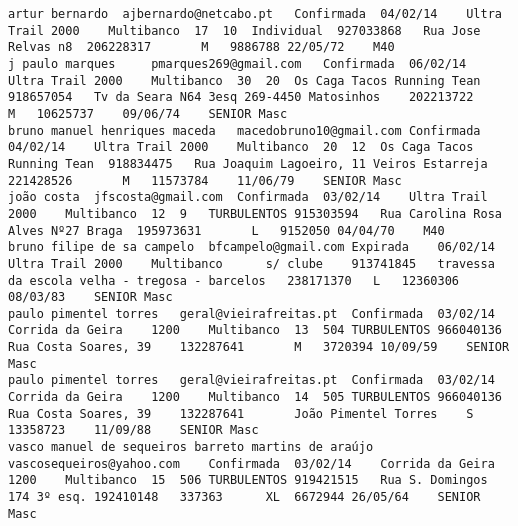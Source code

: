 \documentclass[11pt,a4paper]{report}
\begin{document}
\begin{verbatim}
artur bernardo 	ajbernardo@netcabo.pt	Confirmada	04/02/14	Ultra Trail	2000	Multibanco	17	10	Individual	927033868	Rua Jose Relvas n8	206228317		M	9886788	22/05/72	M40	
j paulo marques 	pmarques269@gmail.com	Confirmada	06/02/14	Ultra Trail	2000	Multibanco	30	20	Os Caga Tacos Running Tean	918657054	Tv da Seara N64 3esq 269-4450 Matosinhos	202213722		M	10625737	09/06/74	SENIOR Masc	
bruno manuel henriques maceda 	macedobruno10@gmail.com	Confirmada	04/02/14	Ultra Trail	2000	Multibanco	20	12	Os Caga Tacos Running Tean	918834475	Rua Joaquim Lagoeiro, 11 Veiros Estarreja	221428526		M	11573784	11/06/79	SENIOR Masc	
joão costa 	jfscosta@gmail.com	Confirmada	03/02/14	Ultra Trail	2000	Multibanco	12	9	TURBULENTOS	915303594	Rua Carolina Rosa Alves Nº27 Braga	195973631		L	9152050	04/04/70	M40	
bruno filipe de sa campelo 	bfcampelo@gmail.com	Expirada	06/02/14	Ultra Trail	2000	Multibanco		s/ clube	913741845	travessa da escola velha - tregosa - barcelos	238171370	L	12360306	08/03/83	SENIOR Masc	
paulo pimentel torres 	geral@vieirafreitas.pt	Confirmada	03/02/14	Corrida da Geira	1200	Multibanco	13	504	TURBULENTOS	966040136	Rua Costa Soares, 39	132287641		M	3720394	10/09/59	SENIOR Masc	
paulo pimentel torres 	geral@vieirafreitas.pt	Confirmada	03/02/14	Corrida da Geira	1200	Multibanco	14	505	TURBULENTOS	966040136	Rua Costa Soares, 39	132287641		João Pimentel Torres	S	13358723	11/09/88	SENIOR Masc	
vasco manuel de sequeiros barreto martins de araújo 	vascosequeiros@yahoo.com	Confirmada	03/02/14	Corrida da Geira	1200	Multibanco	15	506	TURBULENTOS	919421515	Rua S. Domingos 174 3º esq.	192410148	337363		XL	6672944	26/05/64	SENIOR Masc	
    \end{verbatim}
\newpage
\end{document}

